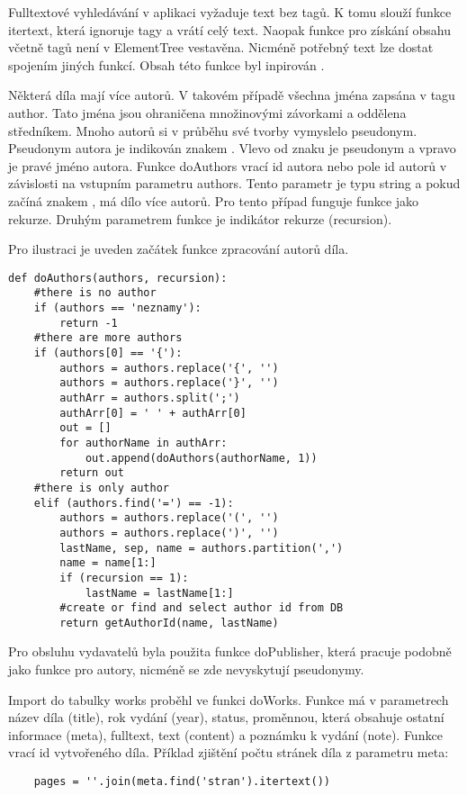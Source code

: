             Fulltextové vyhledávání v aplikaci vyžaduje text bez tagů. K tomu slouží funkce itertext, která ignoruje tagy a vrátí celý text. Naopak funkce pro získání obsahu včetně tagů není v ElementTree vestavěna. Nicméně potřebný text lze dostat spojením jiných funkcí. Obsah této funkce byl inpirován \cite{fn01}. 
            
            Některá díla mají více autorů. V takovém případě všechna jména zapsána v tagu author. Tato jména jsou ohraničena množinovými závorkami a oddělena středníkem. Mnoho autorů si v průběhu své tvorby vymyslelo pseudonym. Pseudonym autora je indikován znakem \uv{=}. Vlevo od znaku je pseudonym a vpravo je pravé jméno autora. Funkce doAuthors vrací id autora nebo pole id autorů v závislosti na vstupním parametru authors. Tento parametr je typu string a pokud začíná znakem \uv{\{}, má dílo více autorů. Pro tento případ funguje funkce jako rekurze. Druhým parametrem funkce je indikátor rekurze (recursion).
            
            Pro ilustraci je uveden začátek funkce zpracování autorů díla.
             \begin{verbatim}
def doAuthors(authors, recursion):
    #there is no author
    if (authors == 'neznamy'):
        return -1
    #there are more authors
    if (authors[0] == '{'):
        authors = authors.replace('{', '')
        authors = authors.replace('}', '')
        authArr = authors.split(';')
        authArr[0] = ' ' + authArr[0]
        out = []
        for authorName in authArr:
            out.append(doAuthors(authorName, 1))
        return out
    #there is only author 
    elif (authors.find('=') == -1):
        authors = authors.replace('(', '')
        authors = authors.replace(')', '')
        lastName, sep, name = authors.partition(',')
        name = name[1:]
        if (recursion == 1):
            lastName = lastName[1:]
        #create or find and select author id from DB    
        return getAuthorId(name, lastName)
             \end{verbatim}
            
            Pro obsluhu vydavatelů byla použita funkce doPublisher, která pracuje podobně jako funkce pro autory, nicméně se zde nevyskytují pseudonymy. 
            
            Import do tabulky works proběhl ve funkci doWorks. Funkce má v parametrech název díla (title), rok vydání (year), status, proměnnou, která obsahuje ostatní informace (meta), fulltext, text (content) a poznámku k vydání (note). Funkce vrací id vytvořeného díla. Příklad zjištění počtu stránek díla z parametru meta:
            \begin{lstlisting}
    pages = ''.join(meta.find('stran').itertext())
            \end{lstlisting}
            
